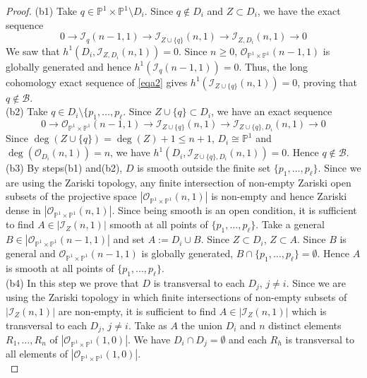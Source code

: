 \documentclass[
  a4paper, 
  reqno, 
  oneside, 
  11pt
]{amsart}
\theoremstyle{plain}	%
\theoremstyle{mydef} %
\theoremstyle{remark}
\theoremstyle{definition}
\theoremstyle{remark}
\begin{document}
\begin{proof}
{(b1)} Take $q\in \mathbb P^1\times \mathbb P^1\setminus D_i$. Since $q\notin D_i$ and $Z\subset D_i$, we have the exact sequence 
\begin{equation}\label{eqa2}
0\to \mathcal I_q(n-1,1)\to \mathcal I_{Z\cup \{q\}}(n,1)\to \mathcal I_{Z,D_i}(n,1)\to 0
\end{equation}
We saw that $h^1(D_i,\mathcal I_{Z,D_i}(n,1))=0$. Since $n\ge 0$, $\mathcal O_{\mathbb P^1\times \mathbb P^1}(n-1,1)$ is globally generated and hence $h^1(\mathcal I_q(n-1,1)) =0$. Thus, the 
long cohomology exact sequence of \eqref{eqa2} gives $h^1(\mathcal I_{Z\cup \{q\}}(n,1))=0$, proving that $q\notin \mathcal B$.\\

{(b2)} Take $q\in D_i\setminus \{p_1,\dots ,p_\ell$. Since $Z\cup \{q\}\subset D_i$, we have an exact sequence
\begin{equation}\label{eqa3}
0\to \mathcal O_{\mathbb P^1\times \mathbb P^1}(n-1,1)\to \mathcal I_{Z\cup \{q\}}(n,1)\to \mathcal I_{Z\cup \{q\},D_i}(n,1)\to 0
\end{equation}
Since $\deg(Z\cup \{q\})=\deg(Z)+1\le n+1$, $D_i\cong \mathbb P^1$ and $\deg(\mathcal O_{D_i}(n,1)) =n$, we have $h^1(D_i,\mathcal I_{Z\cup \{q\},D_i}(n,1)) =0$. Hence $q\notin \mathcal B$.\\

{(b3)} By steps(b1) and(b2), $D$ is smooth outside the finite set $\{p_1,\dots ,p_\ell\}$. Since we are using the Zariski topology,
any finite intersection of non-empty Zariski open subsets of the projective space $|\mathcal O_{\mathbb P^1\times \mathbb P^1}(n,1)|$ is non-empty and hence Zariski dense in $|\mathcal O_{\mathbb P^1\times \mathbb P^1}(n,1)|$. Since being smooth is an open condition, it is sufficient to find $A\in |\mathcal I_Z(n,1)|$ smooth at all points of $\{p_1,\dots ,p_\ell\}$.
Take a general $B\in |\mathcal O_{\mathbb P^1\times \mathbb P^1}(n-1,1)|$ and set $A:= D_i\cup B$. Since $Z\subset D_i$, $Z\subset A$. Since $B$ is general and $\mathcal O_{\mathbb P^1\times \mathbb P^1}(n-1,1)$ is globally generated, $B\cap \{p_1,\dots ,p_\ell\}=\emptyset$. Hence  $A$ is smooth at all points of $\{p_1,\dots ,p_\ell\}$.\\

{(b4)} In this step we prove that $D$ is transversal to each $D_j$, $j\ne i$. Since we are using the Zariski topology in which finite intersections of non-empty subsets of $|\mathcal I_Z(n,1)|$ are non-empty, it is sufficient to find $A\in |\mathcal I_Z(n,1)|$ which is transversal to each $D_j$, $j\ne i$. Take as $A$ the union $D_i$ and $n$ distinct elements $R_1,\dots ,R_n$ of $|\mathcal O_{\mathbb P^1\times \mathbb P^1}(1,0)|$. We have $D_i\cap D_j=\emptyset$ and each $R_h$ is transversal to all elements
of $|\mathcal O_{\mathbb P^1\times \mathbb P^1}(1,0)|$.\\


\end{proof}
\end{document}
